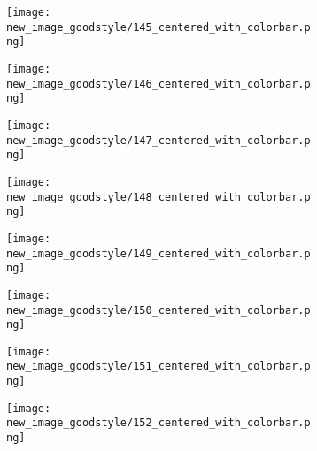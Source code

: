 \documentclass[a4paper,12pt]{article}
\begin{document}
\begin{figure}[H]
  \begin{subfigure}{0.11\textwidth}
    \texttt{[image: new\_image\_goodstyle/145\_centered\_with\_colorbar.png]}
  \end{subfigure}
  \hfill
  \begin{subfigure}{0.11\textwidth}
    \texttt{[image: new\_image\_goodstyle/146\_centered\_with\_colorbar.png]}
  \end{subfigure}
  \hfill
  \begin{subfigure}{0.11\textwidth}
    \texttt{[image: new\_image\_goodstyle/147\_centered\_with\_colorbar.png]}
  \end{subfigure}
  \hfill
  \begin{subfigure}{0.11\textwidth}
    \texttt{[image: new\_image\_goodstyle/148\_centered\_with\_colorbar.png]}
  \end{subfigure}
  \hfill
  \begin{subfigure}{0.11\textwidth}
    \texttt{[image: new\_image\_goodstyle/149\_centered\_with\_colorbar.png]}
  \end{subfigure}
  \hfill
  \begin{subfigure}{0.11\textwidth}
    \texttt{[image: new\_image\_goodstyle/150\_centered\_with\_colorbar.png]}
  \end{subfigure}
  \hfill
  \begin{subfigure}{0.11\textwidth}
    \texttt{[image: new\_image\_goodstyle/151\_centered\_with\_colorbar.png]}
  \end{subfigure}
  \hfill
  \begin{subfigure}{0.11\textwidth}
    \texttt{[image: new\_image\_goodstyle/152\_centered\_with\_colorbar.png]}
  \end{subfigure}
  \hfill
\end{figure}
\end{document}
